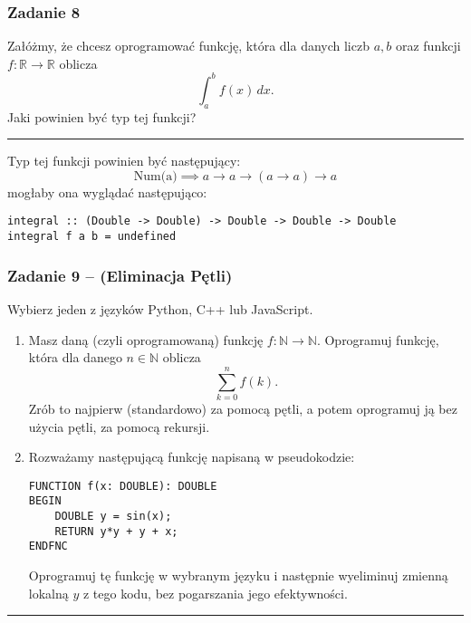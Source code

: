 \documentclass[11pt,a4paper]{article}
\begin{document}
\subsubsection{Zadanie 8}
Załóżmy, że chcesz oprogramować funkcję, która dla danych liczb \( a, b \) oraz funkcji \( f: \mathbb{R} \to \mathbb{R} \) oblicza
\[
\int_{a}^{b} f(x) \,dx.
\]
Jaki powinien być typ tej funkcji?

\bigskip
\hrule
\bigskip

Typ tej funkcji powinien być następujący:
\[
    \text{Num(a)} \implies a \rightarrow a \rightarrow (a \rightarrow a) \rightarrow a
\]
mogłaby ona wyglądać następująco:
\begin{Verbatim}[frame=single]
integral :: (Double -> Double) -> Double -> Double -> Double
integral f a b = undefined
\end{Verbatim}

\subsubsection{Zadanie 9 -- (Eliminacja Pętli)}
Wybierz jeden z języków Python, C++ lub JavaScript.

\begin{enumerate}
    \item Masz daną (czyli oprogramowaną) funkcję \( f: \mathbb{N} \to \mathbb{N} \). Oprogramuj funkcję, która dla danego \( n \in \mathbb{N} \) oblicza
    \[
    \sum_{k=0}^{n} f(k).
    \]
    Zrób to najpierw (standardowo) za pomocą pętli, a potem oprogramuj ją bez użycia pętli, za pomocą rekursji.

    \item Rozważamy następującą funkcję napisaną w pseudokodzie:
        \begin{Verbatim}[frame=single]
FUNCTION f(x: DOUBLE): DOUBLE
BEGIN
    DOUBLE y = sin(x);
    RETURN y*y + y + x;
ENDFNC
        \end{Verbatim}

    Oprogramuj tę funkcję w wybranym języku i następnie wyeliminuj zmienną lokalną \( y \) z tego kodu, bez pogarszania jego efektywności.
\end{enumerate}

\bigskip
\hrule
\bigskip
\end{document}
